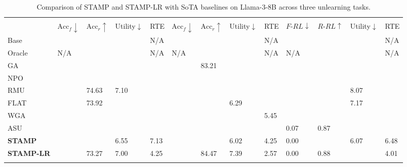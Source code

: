 \begin{table}[htbp]
\centering
\caption{Comparison of STAMP and STAMP-LR with SoTA baselines on Llama-3-8B across three unlearning tasks.}
\label{tab:STAMP-Comparison}
\renewcommand{\arraystretch}{1.05}
{\small
\begin{tabularx}{\textwidth}{l|*{4}{>{\centering\arraybackslash}X}|*{4}{>{\centering\arraybackslash}X}|*{4}{>{\centering\arraybackslash}X}}
\Xhline{1.15pt}
\multirow{2}{*}{\vspace{-0.2cm}\textbf{Method}}  &
\multicolumn{4}{c|}{\textbf{Harmful Knowledge Removal}} &
\multicolumn{4}{c|}{\textbf{Misinformation Removal}} &
\multicolumn{4}{c}{\textbf{Personal Data Erasure}} \\
\cmidrule(lr){2-5}\cmidrule(lr){6-9}\cmidrule(lr){10-13}
& $\mathrm{Acc}_\textit{f}{\downarrow}$ & $\mathrm{Acc}_\textit{r}{\uparrow}$ & Utility$\downarrow$ & RTE 
& $\mathrm{Acc}_\textit{f}{\downarrow}$ & $\mathrm{Acc}_\textit{r}{\uparrow}$ & Utility$\downarrow$ & RTE 
& $F\text{-}RL{\downarrow}$ & $R\text{-}RL{\uparrow}$ & Utility$\downarrow$ & RTE  \\
\Xhline{1.15pt}
Base
  & 75.30 & 78.50 & 5.90 & N/A
  & 83.70 & 86.30 & 5.75 & N/A
  & 0.87  & 0.89  & 5.01 & N/A \\
\rowcolor{gray!15}
Oracle
  & N/A    & 77.37 & 6.10 & N/A
  & N/A    & 85.30 & 5.25 & N/A
  & N/A    & 0.90  & 5.01 & N/A \\
\midrule
GA~\cite{yao2024large}
  & 0.00 & 73.27 & 11.27 & 12.25
  & 0.00 & \colorbox{yellow!40}{83.21} & 10.26 & 6.58
  & 0.13 & 0.81  & 10.17 & 10.41 \\
\rowcolor{gray!15}
NPO~\cite{zhang2024negative}
  & 0.00 & 71.37 &  9.27 & 11.17
  & 0.10 & 80.60 & 11.27 & 6.32
  & 0.27 & 0.83  & 10.00 & 9.48 \\
RMU~\cite{li2024wmdp}
  & 0.00 & \colorbox{green!30}{74.63} &  {7.10} & 12.50
  & 0.27 & 82.17 &  8.10 & 6.00
  & 0.16 & 0.75  & {8.07} & 9.36\\
\rowcolor{gray!15}
FLAT~\cite{wang2024llm}
  & 0.01 & \colorbox{yellow!40}{73.92} &  8.36 & 12.13
  & 1.30 & 80.01 &  \colorbox{yellow!40}{6.29} & 7.12
  & 0.33 & 0.79  &  \colorbox{yellow!40}{7.17} & 11.25\\
WGA~\cite{wang2025rethinking}
  & 2.10 & 70.17 & 11.99 & 11.20
  & 2.47 & 78.30 & 10.90 & {5.45}
  & 0.45 & 0.85  &  9.93 & 9.24\\
\rowcolor{gray!15}
ASU~\cite{zade2026attention}
  & 0.90 & 68.39 &  7.91 & 12.13
  & 0.10 & 79.93 &  7.17 & 6.36
  & {0.07} & \colorbox{yellow!40}{0.87}  &  8.18 & 10.57\\
\midrule\midrule
\textbf{STAMP}
  & 0.00 & 70.13 &  \colorbox{green!30}{6.55} & \colorbox{yellow!40}{7.13}
  & 0.00 & 80.13 &  \colorbox{green!30}{6.02} & \colorbox{yellow!40}{4.25}
  & {0.00}  & 0.79  &  \colorbox{green!30}{6.07} & \colorbox{yellow!40}{6.48} \\
\textbf{STAMP-LR}
  & 0.00 & {73.27} & \colorbox{yellow!40}{7.00} & \colorbox{green!30}{4.25}
  & 0.00 & \colorbox{green!30}{84.47} & {7.39} & \colorbox{green!30}{2.57}
  & {0.00}  & \colorbox{green!30}{0.88} & 8.17 & \colorbox{green!30}{4.01} \\
\Xhline{1.15pt}
\end{tabularx}%
}
\end{table}